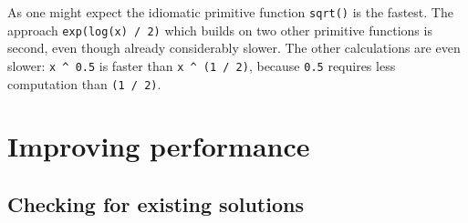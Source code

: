 \documentclass[
]{krantz}
\makeatletter
\newenvironment{Shaded}{\begin{snugshade}}{\end{snugshade}}
\newcommand{\CommentTok}[1]{\textcolor[rgb]{0.56,0.35,0.01}{\textit{#1}}}
\newcommand{\DecValTok}[1]{\textcolor[rgb]{0.00,0.00,0.81}{#1}}
\newcommand{\FloatTok}[1]{\textcolor[rgb]{0.00,0.00,0.81}{#1}}
\newcommand{\KeywordTok}[1]{\textcolor[rgb]{0.13,0.29,0.53}{\textbf{#1}}}
\newcommand{\NormalTok}[1]{#1}
\newcommand{\OperatorTok}[1]{\textcolor[rgb]{0.81,0.36,0.00}{\textbf{#1}}}
\newcommand{\StringTok}[1]{\textcolor[rgb]{0.31,0.60,0.02}{#1}}
\newenvironment{kframe}{%
\medskip{}
\setlength{\fboxsep}{.8em}
 \def\at@end@of@kframe{}%
 \ifinner\ifhmode%
  \def\at@end@of@kframe{\end{minipage}}%
  \begin{minipage}{\columnwidth}%
 \fi\fi%
 \def\FrameCommand##1{\hskip\@totalleftmargin \hskip-\fboxsep
 \colorbox{shadecolor}{##1}\hskip-\fboxsep
     \hskip-\linewidth \hskip-\@totalleftmargin \hskip\columnwidth}%
 \MakeFramed {\advance\hsize-\width
   \@totalleftmargin\z@ \linewidth\hsize
   \@setminipage}}%
 {\par\unskip\endMakeFramed%
 \at@end@of@kframe}
\renewenvironment{Shaded}{\begin{kframe}}{\end{kframe}}
\renewcommand{\KeywordTok} [1]{\textcolor[rgb]{0.00,0.44,0.13}{{#1}}}
\renewcommand{\DecValTok}  [1]{\textcolor[rgb]{0.25,0.63,0.44}{{#1}}}
\renewcommand{\FloatTok}   [1]{\textcolor[rgb]{0.25,0.63,0.44}{{#1}}}
\renewcommand{\StringTok}  [1]{\textcolor[rgb]{0.25,0.44,0.63}{{#1}}}
\renewcommand{\CommentTok} [1]{\textcolor[rgb]{0.38,0.63,0.69}{{#1}}}
\renewcommand{\NormalTok}  [1]{{#1}}
\makeatother
\begin{document}
\begin{Shaded}
\end{Shaded}

As one might expect the idiomatic primitive function \texttt{sqrt()} is the fastest. The approach \texttt{exp(log(x)\ /\ 2)} which builds on two other primitive functions is second, even though already considerably slower. The other calculations are even slower: \texttt{x\ \^{}\ 0.5} is faster than \texttt{x\ \^{}\ (1\ /\ 2)}, because \texttt{0.5} requires less computation than \texttt{(1\ /\ 2)}.

\hypertarget{improving-performance}{%
\chapter{Improving performance}\label{improving-performance}}

\addtocounter{section}{2}

\hypertarget{checking-for-existing-solutions}{%
\section{Checking for existing solutions}\label{checking-for-existing-solutions}}
\end{document}
